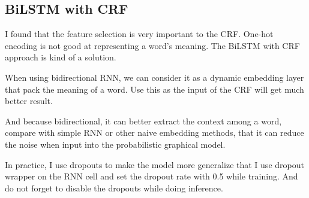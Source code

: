 \subsection{BiLSTM with CRF}
\label{sec:bilstm_crf}

I found that the feature selection is very important to the CRF. One-hot encoding is not good at representing a word's meaning. The BiLSTM with CRF~\cite{huang2015bidirectional} approach is kind of a solution.

When using bidirectional RNN, we can consider it as a dynamic embedding layer that pack the meaning of a word. Use this as the input of the CRF will get much better result.

And because bidirectional, it can better extract the context among a word, compare with simple RNN or other naive embedding methods, that it can reduce the noise when input into the probabilistic graphical model.

In practice, I use dropouts to make the model more generalize that I use dropout wrapper on the RNN cell and set the dropout rate with 0.5 while training. And do not forget to disable the dropouts while doing inference.
